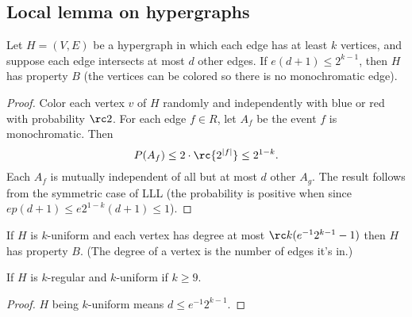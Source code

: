 
\subsection{Local lemma on hypergraphs}

\begin{thm}\label{lllhyper}
Let $H=(V,E)$ be a hypergraph in which each edge has at least $k$ vertices, and suppose each edge intersects at most $d$ other edges. If $e(d+1)\le 2^{k-1}$, then $H$ has property $B$ (the vertices can be colored so there is no monochromatic edge).
\end{thm}
\begin{proof}
Color each vertex $v$ of $H$ randomly and independently with blue or red with probability $\rc 2$. For each edge $f\in R$, let $A_f$ be the event $f$ is monochromatic. Then
\[
P(A_f)\le 2\cdot \rc{2^{|f|}}\leq 2^{1-k}.
\]
Each $A_f$ is mutually independent of all but at most $d$ other $A_g$. The result follows from the symmetric case of LLL (the probability is positive when since $ep(d+1)\leq e2^{1-k}(d+1)\leq 1$).

\end{proof}
\begin{cor}
If $H$ is $k$-uniform and each vertex has degree at most $\rc k  (e^{-1}2^{k-1}-1)$ then $H$ has property $B$. (The degree of a vertex is the number of edges it's in.)

If $H$ is $k$-regular and $k$-uniform if $k\ge 9$.
\end{cor}
\begin{proof}
$H$ being $k$-uniform means $d\leq e^{-1}2^{k-1}$.
\end{proof}
